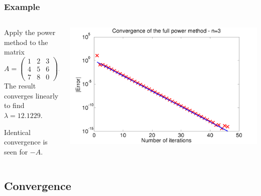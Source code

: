 \documentclass{beamer}
\begin{document}
\begin{frame}
  \frametitle{Example}

  \begin{columns}
    \begin{column}{0.35\textwidth}
      Apply the power method to the matrix
      \begin{equation*}
        A =
        \begin{pmatrix}
          1 & 2 & 3 \\
          4 & 5 & 6 \\
          7 & 8 & 0
        \end{pmatrix}.
      \end{equation*}
      The result converges linearly to find $\lambda = 12.1229$.

      \vspace{1ex}

      Identical convergence is seen for $-A$.
    \end{column}
    \begin{column}{0.65\textwidth}
      \includegraphics[width=\textwidth]{figures/PowerFull1}
    \end{column}
  \end{columns}
\end{frame}


\subsection{Convergence}
\end{document}
